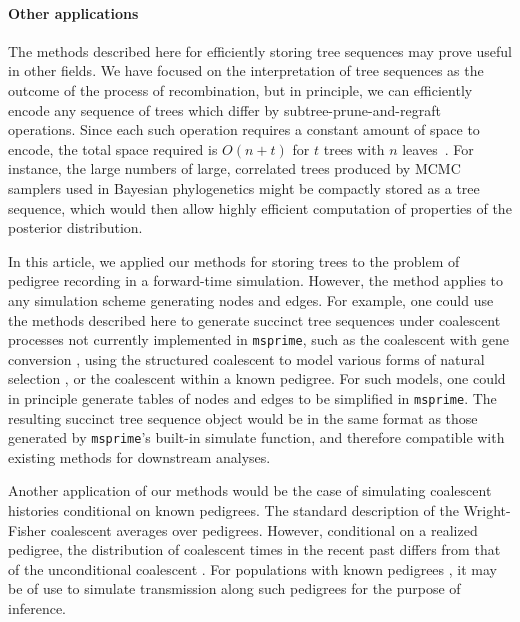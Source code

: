 \documentclass{article}
\newcommand{\msprime}{\texttt{msprime}}
\begin{document}

\paragraph{Other applications}
The methods described here for efficiently storing tree sequences may prove useful in other fields.
We have focused on the interpretation of tree sequences as the outcome of the process
of recombination, but in principle, we can efficiently encode any
sequence of trees which differ by subtree-prune-and-regraft
operations. Since each such operation requires a constant amount of space to encode, the total
space required is $O(n + t)$ for $t$ trees with $n$ leaves~\citep{kelleher2016efficient}.
For instance, the large numbers of large, correlated trees produced by
MCMC samplers used in Bayesian phylogenetics \citep[e.g.,][]{drummond2012bayesian}
might be compactly stored as a tree sequence,
which would then allow highly efficient computation of properties of the posterior distribution.

In this article, we applied our methods for storing trees to the problem of pedigree recording in a forward-time
simulation.  However, the method applies to any simulation scheme generating nodes and edges.  For example, one could
use the methods described here to generate succinct tree sequences under coalescent processes not currently implemented
in \msprime{}, such as the coalescent with gene conversion \citep{Wiuf2000-rc}, using the structured coalescent to
model various forms of natural selection \citep{Kaplan1988-in,Kaplan1989-rt,Braverman1995-gn},
or the coalescent within a known pedigree.  For such models, one
could in principle generate tables of nodes and edges to be simplified in \msprime{}.  The resulting succinct tree
sequence object would be in the same format as those generated by \msprime{}'s built-in simulate function, and therefore
compatible with existing methods for downstream analyses.

Another application of our methods would be the case of simulating coalescent histories conditional on known pedigrees.
The standard description of the Wright-Fisher coalescent averages over pedigrees.  However, conditional on a realized
pedigree, the distribution of coalescent times in the recent past differs from that of the unconditional coalescent
\citep{Wakeley2012-kw}.  For populations with known pedigrees \citep[\textit{e.g.}][]{Aguillon2017-ac}, it may be of use to
simulate transmission along such pedigrees for the purpose of inference.
\end{document}
